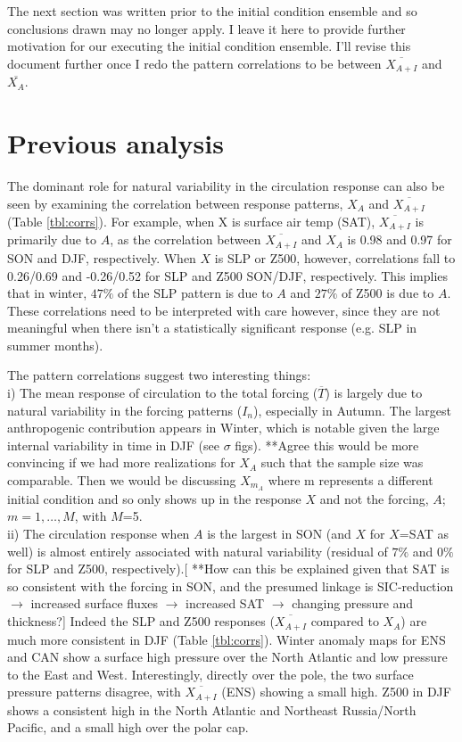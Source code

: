 \documentclass[12pt]{article}
\begin{document}
The next section was written prior to the initial condition ensemble and so conclusions drawn may no longer apply. I leave it here to provide further motivation for our executing the initial condition ensemble. I'll revise this document further once I redo the pattern correlations to be between $\overline{X_{A+I}}$ and $\overline{X_{A}}$.


\section{Previous analysis}

The dominant role for natural variability in the circulation response can also be seen by examining the correlation between response patterns, $X_A$ and $\overline{X_{A+I}}$ (Table \ref{tbl:corrs}). For example, when X is surface air temp (SAT), $\overline{X_{A+I}}$ is primarily due to $A$, as the correlation between $\overline{X_{A+I}}$ and $X_A$ is 0.98 and 0.97 for SON and DJF, respectively. When $X$ is SLP or Z500, however, correlations fall to 0.26/0.69 and -0.26/0.52 for SLP and Z500 SON/DJF, respectively. This implies that in winter, $47\%$ of the SLP pattern is due to $A$ and $27\%$ of Z500 is due to $A$. These correlations need to be interpreted with care however, since they are not meaningful when there isn't a statistically significant response (e.g. SLP in summer months).

The pattern correlations suggest two interesting things:\\
i) The mean response of circulation to the total forcing ($\overline{T}$) is largely due to natural variability in the forcing patterns ($I_n$), especially in Autumn. The largest anthropogenic contribution appears in Winter, which is notable given the large internal variability in time in DJF (see $\sigma$ figs). **Agree this would be more convincing if we had more realizations for $X_A$ such that the sample size was comparable. Then we would be discussing $X_{m_A}$ where m represents a different initial condition and so only shows up in the response $X$ and not the forcing, $A$; $m=1,\ldots,M$, with $M$=5.\\
ii) The circulation response when $A$ is the largest in SON (and $X$ for $X$=SAT as well) is almost entirely associated with natural variability (residual of $7\%$ and $0\%$ for SLP and Z500, respectively).[ **How can this be explained given that SAT is so consistent with the forcing in SON, and the presumed linkage is SIC-reduction $\to$ increased surface fluxes $\to$ increased SAT $\to$ changing pressure and thickness?] Indeed the SLP and Z500 responses ($\overline{X_{A+I}}$ compared to $X_A$) are much more consistent in DJF (Table \ref{tbl:corrs}). Winter anomaly maps for ENS and CAN show a surface high pressure over the North Atlantic and low pressure to the East and West. Interestingly, directly over the pole, the two surface pressure patterns disagree, with $\overline{X_{A+I}}$ (ENS) showing a small high. Z500 in DJF shows a consistent high in the North Atlantic and Northeast Russia/North Pacific, and a small high over the polar cap.
\end{document}
